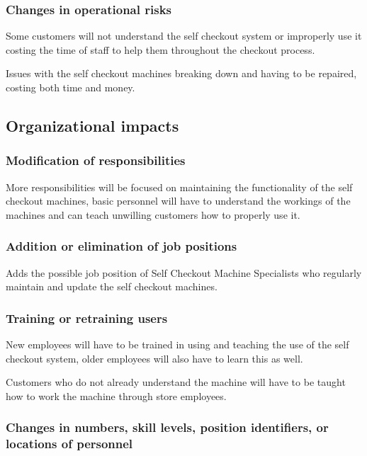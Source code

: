 \subsubsection{Changes in operational risks}
Some customers will not understand the self checkout system or improperly use 
it costing the time of staff to help them throughout 
the checkout process. \newline

\noindent
Issues with the self checkout machines breaking down and having to be 
repaired, costing both time and money. \pagebreak

\subsection{Organizational impacts}

\subsubsection{Modification of responsibilities}

More responsibilities will be focused on maintaining the functionality of 
the self checkout machines, basic personnel will have to understand the 
workings of the machines and can teach unwilling customers 
how to properly use it.

\subsubsection{Addition or elimination of job positions}

Adds the possible job position of Self Checkout Machine Specialists who 
regularly maintain and update the self checkout machines.

\subsubsection{Training or retraining users}

New employees will have to be trained in using and teaching the use of the 
self checkout system, older employees will also 
have to learn this as well. \newline

\noindent
Customers who do not already understand the machine will have to be taught 
how to work the machine through store employees.

\subsubsection{Changes in numbers, skill levels, position identifiers, or 
locations of personnel}

